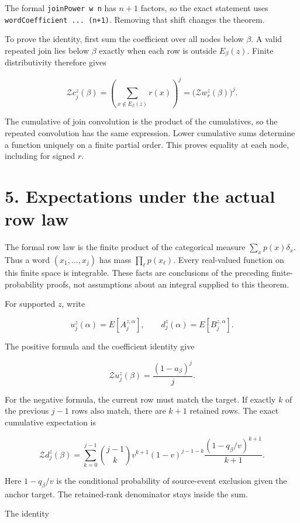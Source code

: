 The formal \texttt{joinPower\ w\ n} has \(n+1\) factors, so the exact statement uses \texttt{wordCoefficient\ ...\ (n+1)}. Removing that shift changes the theorem.

To prove the identity, first sum the coefficient over all nodes below \(\beta\). A valid repeated join lies below \(\beta\) exactly when each row is outside \(E_\beta(z)\). Finite distributivity therefore gives

\[
\mathcal Zc_j^z(\beta)
=\left(\sum_{x\notin E_\beta(z)}r(x)\right)^j
=\bigl(\mathcal Zw_r^z(\beta)\bigr)^j.
\]

The cumulative of join convolution is the product of the cumulatives, so the repeated convolution has the same expression. Lower cumulative sums determine a function uniquely on a finite partial order. This proves equality at each node, including for signed \(r\).

\section{5. Expectations under the actual row law}\label{expectations-under-the-actual-row-law}

The formal row law is the finite product of the categorical measure \(\sum_xp(x)\delta_x\). Thus a word \((x_1,\ldots,x_j)\) has mass \(\prod_\ell p(x_\ell)\). Every real-valued function on this finite space is integrable. These facts are conclusions of the preceding finite-probability proofs, not assumptions about an integral supplied to this theorem.

For supported \(z\), write

\[
u_j^z(\alpha)=E[A_j^{z,\alpha}],\qquad
d_j^z(\alpha)=E[B_j^{z,\alpha}].
\]

The positive formula and the coefficient identity give

\[
\mathcal Zu_j^z(\beta)=\frac{(1-a_\beta)^j}{j}.
\]

For the negative formula, the current row must match the target. If exactly \(k\) of the previous \(j-1\) rows also match, there are \(k+1\) retained rows. The exact cumulative expectation is

\[
\mathcal Zd_j^z(\beta)=
\sum_{k=0}^{j-1}\binom{j-1}{k}
v^{k+1}(1-v)^{j-1-k}
\frac{(1-q_\beta/v)^{k+1}}{k+1}.
\]

Here \(1-q_\beta/v\) is the conditional probability of source-event exclusion given the anchor target. The retained-rank denominator stays inside the sum.

The identity

